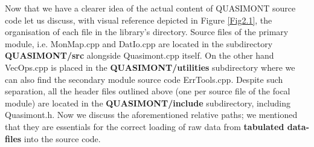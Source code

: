 \documentclass[a4paper, twosided]{book}
\begin{document}
\begin{itemize}
    \newpage
    \vspace{0.5cm}
\end{itemize}

\noindent
Now that we have a clearer idea of the actual content of QUASIMONT source code let us discuss, with visual reference depicted in Figure \ref{Fig2.1}, the organisation of each file in the library's directory. Source files of the primary module, i.e. \colorbox{poliGrayBlue}{MonMap.cpp} and \colorbox{poliGrayBlue}{DatIo.cpp} are located in the subdirectory \colorbox{poliGrayBlue}{\textbf{QUASIMONT/src}} alongside \colorbox{poliGrayBlue}{Quasimont.cpp} itself. On the other hand \colorbox{poliGrayBlue}{VecOps.cpp} is placed in the \colorbox{poliGrayBlue}{\textbf{QUASIMONT/utilities}} subdirectory where we can also find the secondary module source code \colorbox{poliGrayBlue}{ErrTools.cpp}. Despite such separation, all the header files outlined above (one per source file of the focal module) are located in the \colorbox{poliGrayBlue}{\textbf{QUASIMONT/include}} subdirectory, including \colorbox{poliGrayBlue}{Quasimont.h}. Now we discuss the aforementioned relative paths; we mentioned that they are essentials for the correct loading of raw data from \color{poliDarkBlue} \textbf{tabulated data-files} \color{black} into the source code.
\end{document}
